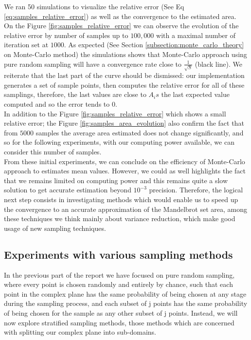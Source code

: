 \documentclass{article}
\begin{document}
    We ran 50 simulations to visualize the relative error (See Eq \ref{eq:samples_relative_error}) as well as the convergence to the estimated area.\\
    On the Figure \ref{fig:samples_relative_error} we can observe the evolution of the relative error by number of samples up to $100,000$ with a maximal number of iteration set at $1000$. As expected (See Section \ref{subsection:monte_carlo_theory} on Monte-Carlo method) the simulations shows that Monte-Carlo approach using pure random sampling will have a convergence rate close to $\frac{1}{\sqrt{S}}$ (black line). We reiterate that the last part of the curve should be dismissed: our implementation generates a set of sample points, then computes the relative error for all of these samplings, therefore, the last values are close to $A_is$ the last expected value computed and so the error tends to 0.\\
    In addition to the Figure \ref{fig:samples_relative_error} which shows a small relative error; the Figure \ref{fig:samples_area_evolution} also confirm the fact that from $5000$ samples the average area estimated does not change significantly, and so for the following experiments, with our computing power available, we can consider this number of samples.\\

    From these initial experiments, we can conclude on the efficiency of Monte-Carlo approach to estimates mean values. However, we could as well highlights the fact that we remains limited on computing power and this remains quite a slow solution to get accurate estimation beyond $10^{-3}$ precision.
    Therefore, the logical next step consists in investigating methods which would enable us to speed up the convergence to an accurate approximation of the Mandelbrot set area, among these techniques we think mainly about variance reduction, which make good usage of new sampling techniques.


    \subsection{Experiments with various sampling methods}

    In the previous part of the report we have focused on pure random sampling, where every point is chosen randomly and entirely by chance, such that each point in the complex plane has the same probability of being chosen at any stage during the sampling process, and each subset of j points has the same probability of being chosen for the sample as any other subset of j points. Instead, we will now explore stratified sampling methods, those methods which are concerned with splitting our complex plane into sub-domains.
\end{document}

